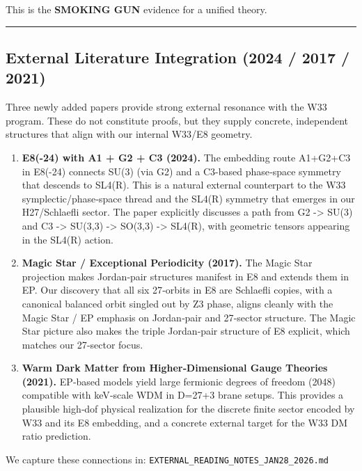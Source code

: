 \documentclass[11pt]{article}
\begin{document}
This is the \textbf{SMOKING GUN} evidence for a unified theory.

\begin{center}\rule{0.5\linewidth}{0.5pt}\end{center}

\subsection{External Literature Integration (2024 / 2017 /
2021)}\label{external-literature-integration-2024-2017-2021}

Three newly added papers provide strong external resonance with the W33
program. These do not constitute proofs, but they supply concrete,
independent structures that align with our internal W33/E8 geometry.

\begin{enumerate}
\def\labelenumi{\arabic{enumi})}
\item
  \textbf{E8(-24) with A1 + G2 + C3 (2024).} The embedding route
  A1+G2+C3 in E8(-24) connects SU(3) (via G2) and a C3-based phase‑space
  symmetry that descends to SL4(R). This is a natural external
  counterpart to the W33 symplectic/phase‑space thread and the SL4(R)
  symmetry that emerges in our H27/Schlaefli sector. The paper
  explicitly discusses a path from G2 -\textgreater{} SU(3) and C3
  -\textgreater{} SU(3,3) -\textgreater{} SO(3,3) -\textgreater{}
  SL4(R), with geometric tensors appearing in the SL4(R) action.
\item
  \textbf{Magic Star / Exceptional Periodicity (2017).} The Magic Star
  projection makes Jordan‑pair structures manifest in E8 and extends
  them in EP. Our discovery that all six 27‑orbits in E8 are Schlaefli
  copies, with a canonical balanced orbit singled out by Z3 phase,
  aligns cleanly with the Magic Star / EP emphasis on Jordan‑pair and
  27‑sector structure. The Magic Star picture also makes the triple
  Jordan‑pair structure of E8 explicit, which matches our 27‑sector
  focus.
\item
  \textbf{Warm Dark Matter from Higher‑Dimensional Gauge Theories
  (2021).} EP‑based models yield large fermionic degrees of freedom
  (2048) compatible with keV‑scale WDM in D=27+3 brane setups. This
  provides a plausible high‑dof physical realization for the discrete
  finite sector encoded by W33 and its E8 embedding, and a concrete
  external target for the W33 DM ratio prediction.
\end{enumerate}

We capture these connections in:
\texttt{EXTERNAL\_READING\_NOTES\_JAN28\_2026.md}
\end{document}
